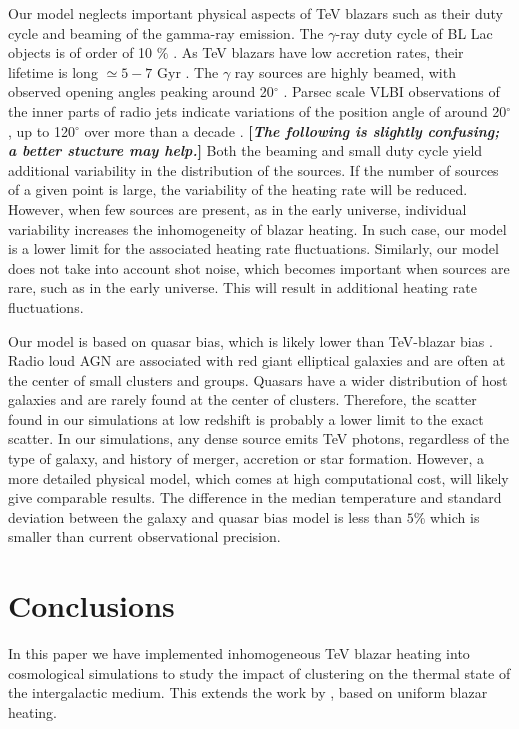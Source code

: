 \documentclass[twocolumns]{emulateapj}
\newcommand\Cc[1]{{\color{blue} \bf #1}} %
\begin{document}
Our model neglects important physical aspects of TeV blazars such as their duty cycle and  beaming of the gamma-ray emission. The  $\gamma$-ray duty cycle of BL Lac objects is of order of 10 $\%$ \citep{1996ApJ...464..600S}.  As TeV blazars have low accretion rates, their lifetime is long $\simeq 5-7$ Gyr \citep{2002ApJ...571..226C}.  The $\gamma$ ray sources are highly beamed, with observed opening angles peaking around 20$^{\circ}$ \citep{2009A&A...507L..33P}.  Parsec scale VLBI observations of the inner parts of radio jets indicate variations of the position angle of around 20$^{\circ}$, up to 120$^{\circ}$ over more than a decade \citep{2013AJ....146..120L}. \Cc{[{\em The following is slightly confusing; a better stucture may help.}]}  Both the beaming and small duty cycle yield  additional variability in the distribution of the sources.   If the number  of sources of a given point is large, the variability of the heating rate  will be  reduced. However, when few sources are present, as in the early universe, individual variability increases the inhomogeneity of blazar heating. In such case, our model is a lower limit for the associated heating rate fluctuations. Similarly, our model does not take into account shot noise, which becomes important when sources are rare, such as in the early universe. This will result in additional heating rate fluctuations.

Our model is based on quasar bias, which is likely lower than TeV-blazar bias \citep{2014arXiv1410.0358A}. Radio loud AGN are associated with red giant elliptical galaxies \citep{2007A&A...476..723H} and are often at the center of small clusters and groups. Quasars have a wider distribution of host galaxies and are rarely found at the center of clusters. Therefore, the scatter found in our simulations at low redshift is probably a lower limit to the exact scatter. In our simulations, any dense source emits TeV photons, regardless of the type of galaxy, and history of merger, accretion  or star formation.  However, a more detailed physical model, which comes at high computational cost, will likely give comparable results. The difference in the median temperature and standard deviation between the galaxy and quasar bias model  is less than $5\%$ which is smaller than current observational precision. 

\section{Conclusions}
In this paper we  have implemented inhomogeneous TeV blazar heating into cosmological simulations to study the impact of clustering on the thermal state of the intergalactic medium. This extends the work by  \citet{2012ApJ...752...23C,2012MNRAS.423..149P}, based on uniform blazar heating.
\end{document}
